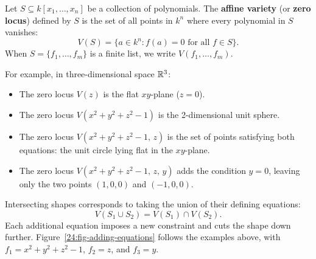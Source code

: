 \begin{definition}
Let $S \subseteq k[x_1, \dots, x_n]$ be a collection of polynomials. The \textbf{affine variety} (or \textbf{zero locus}) defined by $S$ is the set of all points in $k^n$ where every polynomial in $S$ vanishes:
\[
V(S) = \{a \in k^n : f(a) = 0 \text{ for all } f \in S\}.
\]
When $S = \{f_1, \dots, f_m\}$ is a finite list, we write $V(f_1, \dots, f_m)$.
\end{definition}

For example, in three-dimensional space $\mathbb{R}^3$:
\begin{itemize}
\item The zero locus $V(z)$ is the flat $xy$-plane ($z = 0$).
\item The zero locus $V(x^2 + y^2 + z^2 - 1)$ is the 2-dimensional unit sphere.
\item The zero locus $V(x^2 + y^2 + z^2 - 1, \, z)$ is the set of points satisfying both equations: the unit circle lying flat in the $xy$-plane.
\item The zero locus $V(x^2 + y^2 + z^2 - 1, \, z, \, y)$ adds the condition $y = 0$, leaving only the two points $(1, 0, 0)$ and $(-1, 0, 0)$.
\end{itemize}
Intersecting shapes corresponds to taking the union of their defining equations:
\[
V(S_1 \cup S_2) = V(S_1) \cap V(S_2).
\]
Each additional equation imposes a new constraint and cuts the shape down further. Figure~\ref{24:fig-adding-equations} follows the examples above, with $f_1 = x^2 + y^2 + z^2 - 1$, $f_2 = z$, and $f_3 = y$.

